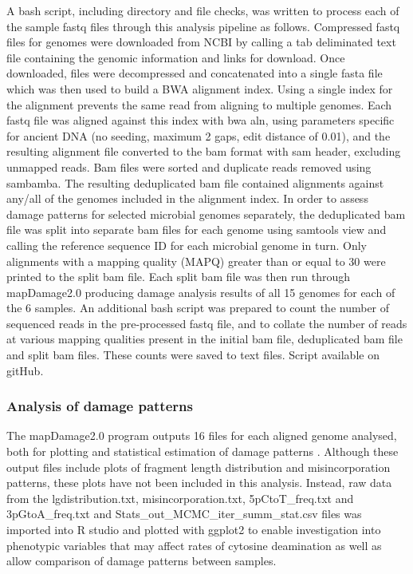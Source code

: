 \documentclass[12pt, a4paper]{article}
\begin{document}
A bash script, including directory and file checks, was written to process each of the sample fastq files through this analysis pipeline as follows. 
Compressed fastq files for genomes were downloaded from NCBI by calling a tab deliminated text file containing the genomic information and links for download. 
Once downloaded, files were decompressed and concatenated into a single fasta file which was then used to build a BWA alignment index. 
Using a single index for the alignment prevents the same read from aligning to multiple genomes.
Each fastq file was aligned against this index with bwa aln, using parameters specific for ancient DNA (no seeding, maximum 2 gaps, edit distance of 0.01), and the resulting alignment file converted to the bam format with sam header, excluding unmapped reads. 
Bam files were sorted and duplicate reads removed using sambamba. 
The resulting deduplicated bam file contained alignments against any/all of the genomes included in the alignment index. 
In order to assess damage patterns for selected microbial genomes separately, the deduplicated bam file was split into separate bam files for each genome using samtools view and calling the reference sequence ID for each microbial genome in turn. 
Only alignments with a mapping quality (MAPQ) greater than or equal to 30 were printed to the split bam file. 
Each split bam file was then run through mapDamage2.0 producing damage analysis results of all 15 genomes for each of the 6 samples. 
An additional bash script was prepared to count the number of sequenced reads in the pre-processed fastq file, and to collate the number of reads at various mapping qualities present in the initial bam file, deduplicated bam file and split bam files. 
These counts were saved to text files. 
Script available on gitHub.

\subsubsection{Analysis of damage patterns}

The mapDamage2.0 program outputs 16 files for each aligned genome analysed, both for plotting and statistical estimation of damage patterns \cite{Jonsson:2013aa}. 
Although these output files include plots of fragment length distribution and misincorporation patterns, these plots have not been included in this analysis. 
Instead, raw data from the lgdistribution.txt, misincorporation.txt, 5pCtoT\_freq.txt and 3pGtoA\_freq.txt and Stats\_out\_MCMC\_iter\_summ\_stat.csv files was imported into R studio and plotted with ggplot2 to enable investigation into phenotypic variables that may affect rates of cytosine deamination as well as allow comparison of damage patterns between samples.
 
\end{document}
